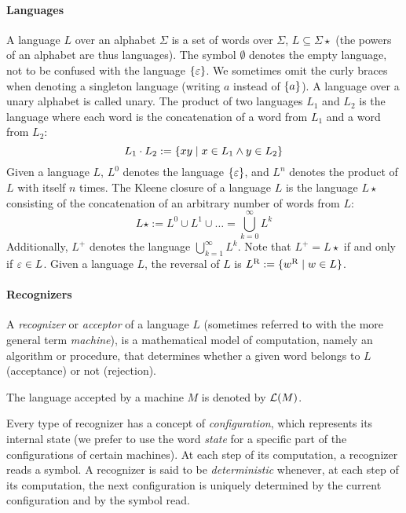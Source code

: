\paragraph{Languages} A language $L$ over an alphabet $\Sigma$ is a set of words over $\Sigma$, \ie $L\subseteq\Sigma\star$ (the powers of an alphabet are thus languages).
The symbol $\emptyset$ denotes the empty language, not to be confused with the language $\{\varepsilon\}$.
We sometimes omit the curly braces when denoting a singleton language (writing $a$ instead of $\{a\}$).
A language over a unary alphabet is called unary.
The product of two languages $L_1$ and $L_2$ is the language where each word is the concatenation of a word from $L_1$ and a word from $L_2$: \begin{equation*} L_1\cdot L_2 := \{xy\mid x\in L_1 \land y\in L_2\} \end{equation*} Given a language $L$, $L^0$ denotes the language $\{\varepsilon\}$, and $L^n$ denotes the product of $L$ with itself $n$ times.
The Kleene closure of a language $L$ is the language $L\star$ consisting of the concatenation of an arbitrary number of words from $L$: \begin{equation*} L\star := L^0\cup L^1\cup\dots=\bigcup_{k=0}^\infty L^k \end{equation*} Additionally, $L^+$ denotes the language $\bigcup_{k=1}^\infty L^k$.
Note that $L^+=L\star$ if and only if $\varepsilon\in L$.
Given a language $L$, the reversal of $L$ is $L^{\mathrm R}:=\{w^{\mathrm R} \mid w\in L\}$.

\paragraph{Recognizers} A \emph{recognizer} or \emph{acceptor} of a language $L$ (sometimes referred to with the more general term \emph{machine}), is a mathematical model of computation, namely an algorithm or procedure, that determines whether a given word belongs to $L$ (acceptance) or not (rejection).

The language accepted by a machine $M$ is denoted by $\mathcal L(M)$.

Every type of recognizer has a concept of \emph{configuration}, which represents its internal state (we prefer to use the word \emph{state} for a specific part of the configurations of certain machines).
At each step of its computation, a recognizer reads a symbol.
A recognizer is said to be \emph{deterministic} whenever, at each step of its computation, the next configuration is uniquely determined by the current configuration and by the symbol read.



